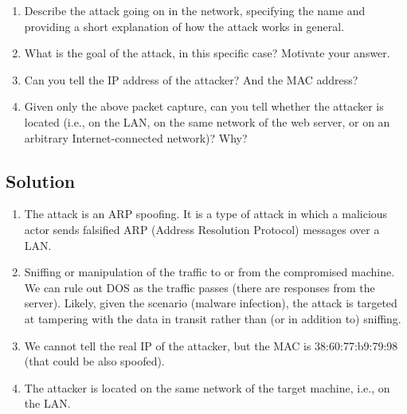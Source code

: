\begin{enumerate}
    \item Describe the attack going on in the network, specifying the name and providing a short explanation of how the attack works in general.
    \item What is the goal of the attack, in this specific case? Motivate your answer.
    \item Can you tell the IP address of the attacker? And the MAC address?
    \item Given only the above packet capture, can you tell whether the attacker is located (i.e., on the LAN, on the same network of the web server, or on an arbitrary Internet-connected network)? Why?
\end{enumerate}

\subsection*{Solution}
\begin{enumerate}
    \item The attack is an ARP spoofing. 
        It is a type of attack in which a malicious actor sends falsified ARP (Address Resolution Protocol) messages over a LAN.
    \item Sniffing or manipulation of the traffic to or from the compromised machine. 
        We can rule out DOS as the traffic passes (there are responses from the server).
        Likely, given the scenario (malware infection), the attack is targeted at tampering with the data in transit rather than (or in addition to) sniffing.
    \item We cannot tell the real IP of the attacker, but the MAC is 38:60:77:b9:79:98 (that could be also spoofed).
    \item The attacker is located on the same network of the target machine, i.e., on the LAN. 
\end{enumerate}